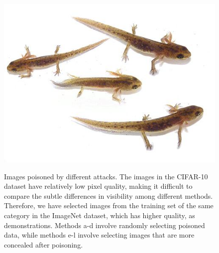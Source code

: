 \documentclass{article}
\begin{document}
\begin{figure}[h]
{\includegraphics[width=0.2\linewidth]{Styles/figures/2_Q24_48_8.jpeg}}
\caption{Images poisoned by different attacks. The images in the CIFAR-10 dataset have relatively low pixel quality, making it difficult to compare the subtle differences in visibility among different methods. Therefore, we have selected images from the training set of the same category in the ImageNet dataset, which has higher quality, as demonstrations. Methods a-d involve randomly selecting poisoned data, while methods e-l involve selecting images that are more concealed after poisoning.} 
\end{figure}
\end{document}
